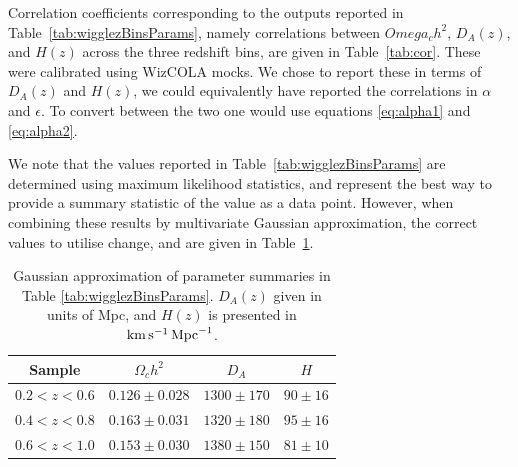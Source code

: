 \documentclass[a4paper,fleqn,usenatbib]{mnras}
\begin{document}
Correlation coefficients corresponding to the outputs reported in Table~\ref{tab:wigglezBinsParams}, namely correlations between $Omega_c h^2$, $D_A(z)$, and $H(z)$ across the three redshift bins, are given in Table~\ref{tab:cor}.  These were calibrated using WizCOLA mocks.  We chose to report these in terms of $D_A(z)$ and $H(z)$, we could equivalently have reported the correlations in $\alpha$ and $\epsilon$.  To convert between the two one would use equations \ref{eq:alpha1} and \ref{eq:alpha2}.

We note that the values reported in Table~\ref{tab:wigglezBinsParams} are determined using maximum likelihood statistics, and represent the best way to provide a summary statistic of the value as a data point. However, when combining these results by multivariate Gaussian approximation, the correct values to utilise change, and are given in Table~\ref{tab:gauss}.


\begin{table}
	\centering
	\caption{Gaussian approximation of parameter summaries in Table \ref{tab:wigglezBinsParams}. $D_A(z)$ given in units of Mpc, and $H(z)$ is presented in ${\rm km}\,{\rm s}^{-1} \, {\rm Mpc}^{-1}$.}
	\label{tab:gauss}
	\begin{tabular}{cccc}
		\hline
		Sample & $\Omega_c h^2$ &  $D_A$ &  $H$ \\
		\hline
		$0.2 < z < 0.6$ & $0.126\pm0.028$ & $1300\pm170$ & $90\pm16$ \\
		$0.4 < z < 0.8$ & $0.163\pm0.031$ & $1320\pm180$ & $95\pm16$ \\
		$0.6 < z < 1.0$ & $0.153\pm0.030$ & $1380\pm150$ & $81\pm10$ \\
		\hline
	\end{tabular}
\end{table}
\end{document}
